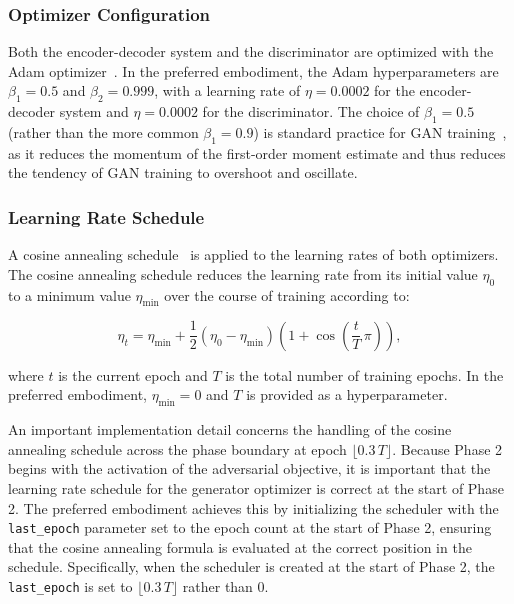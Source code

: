 \documentclass[12pt,letterpaper]{article}
\begin{document}
\subsubsection{Optimizer Configuration}

Both the encoder-decoder system and the discriminator are optimized with the
Adam optimizer~\cite{kingma2015}. In the preferred embodiment, the Adam
hyperparameters are $\beta_1 = 0.5$ and $\beta_2 = 0.999$, with a learning
rate of $\eta = 0.0002$ for the encoder-decoder system and $\eta = 0.0002$ for
the discriminator. The choice of $\beta_1 = 0.5$ (rather than the more common
$\beta_1 = 0.9$) is standard practice for GAN training~\cite{radford2016}, as
it reduces the momentum of the first-order moment estimate and thus reduces the
tendency of GAN training to overshoot and oscillate.

\subsubsection{Learning Rate Schedule}

A cosine annealing schedule~\cite{loshchilov2017} is applied to the learning
rates of both optimizers. The cosine annealing schedule reduces the learning
rate from its initial value $\eta_0$ to a minimum value $\eta_{\min}$ over the
course of training according to:

\begin{equation}
  \eta_t = \eta_{\min} + \frac{1}{2}(\eta_0 - \eta_{\min})
    \left(1 + \cos\!\left(\frac{t}{T}\,\pi\right)\right),
  \label{eq:lr}
\end{equation}

\noindent where $t$ is the current epoch and $T$ is the total number of
training epochs. In the preferred embodiment, $\eta_{\min} = 0$ and $T$ is
provided as a hyperparameter.

An important implementation detail concerns the handling of the cosine
annealing schedule across the phase boundary at epoch $\lfloor 0.3\,T \rfloor$.
Because Phase 2 begins with the activation of the adversarial objective, it
is important that the learning rate schedule for the generator optimizer is
correct at the start of Phase 2. The preferred embodiment achieves this by
initializing the scheduler with the \texttt{last\_epoch} parameter set to the
epoch count at the start of Phase 2, ensuring that the cosine annealing
formula is evaluated at the correct position in the schedule. Specifically,
when the scheduler is created at the start of Phase 2, the
\texttt{last\_epoch} is set to $\lfloor 0.3\,T \rfloor$ rather than $0$.
\end{document}
